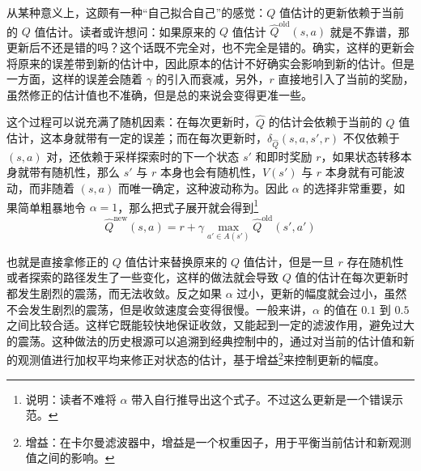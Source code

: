 从某种意义上，这颇有一种“自己拟合自己”的感觉：$Q$ 值估计的更新依赖于当前的 $Q$ 值估计。读者或许想问：如果原来的 $Q$ 值估计 $\hat Q^{\text{old}} (s, a)$ 就是不靠谱，那更新后不还是错的吗？这个话既不完全对，也不完全是错的。确实，这样的更新会将原来的误差带到新的估计中，因此原本的估计不好确实会影响到新的估计。但是一方面，这样的误差会随着 $\gamma$ 的引入而衰减，另外，$r$ 直接地引入了当前的奖励，虽然修正的估计值也不准确，但是总的来说会变得更准一些。

这个过程可以说充满了随机因素：在每次更新时，$\hat Q$ 的估计会依赖于当前的 $Q$ 值估计，这本身就带有一定的误差；而在每次更新时，$\delta_{\hat Q} (s, a, s', r)$ 不仅依赖于 $(s, a)$ 对，还依赖于采样探索时的下一个状态 $s'$ 和即时奖励 $r$，如果状态转移本身就带有随机性，那么 $s'$ 与 $r$ 本身也会有随机性，$V(s')$ 与 $r$ 本身就有可能波动，而非随着 $(s, a)$ 而唯一确定，这种波动称为。因此 $\alpha$ 的选择非常重要，如果简单粗暴地令 $\alpha = 1$，那么把式子展开就会得到\footnote{说明：读者不难将 $\alpha$ 带入自行推导出这个式子。不过这么更新是一个错误示范。}
\[
    \hat Q^{\text{new}} (s, a) = r + \gamma \max_{a' \in A(s')} \hat Q^{\text{old}} (s', a') 
\]

也就是直接拿修正的 $Q$ 值估计来替换原来的 $Q$ 值估计，但是一旦 $r$ 存在随机性或者探索的路径发生了一些变化，这样的做法就会导致 $Q$ 值的估计在每次更新时都发生剧烈的震荡，而无法收敛。反之如果 $\alpha$ 过小，更新的幅度就会过小，虽然不会发生剧烈的震荡，但是收敛速度会变得很慢。一般来讲，$\alpha$ 的值在 $0.1$ 到 $0.5$ 之间比较合适。这样它既能较快地保证收敛，又能起到一定的滤波作用，避免过大的震荡。这种做法的历史根源可以追溯到经典控制中的，通过对当前的估计值和新的观测值进行加权平均来修正对状态的估计，基于增益\footnote{增益：在卡尔曼滤波器中，增益是一个权重因子，用于平衡当前估计和新观测值之间的影响。}来控制更新的幅度。

